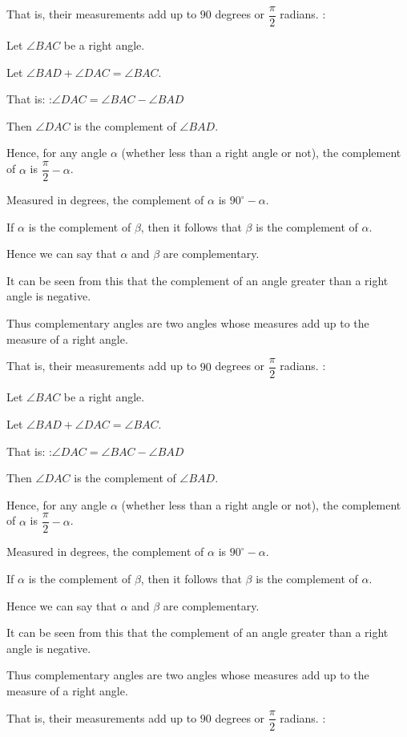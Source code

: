 That is, their measurements add up to $90$ degrees or $\dfrac \pi 2$ radians.
:

Let $\angle BAC$ be a right angle.

Let $\angle BAD + \angle DAC = \angle BAC$.

That is:
:$\angle DAC = \angle BAC - \angle BAD$


Then $\angle DAC$ is the complement of $\angle BAD$.


Hence, for any angle $\alpha$ (whether less than a right angle or not), the complement of $\alpha$ is $\dfrac \pi 2 - \alpha$.

Measured in degrees, the complement of $\alpha$ is $90^\circ - \alpha$.


If $\alpha$ is the complement of $\beta$, then it follows that $\beta$ is the complement of $\alpha$.

Hence we can say that $\alpha$ and $\beta$ are complementary.


It can be seen from this that the complement of an angle greater than a right angle is negative.


Thus complementary angles are two angles whose measures add up to the measure of a right angle.

That is, their measurements add up to $90$ degrees or $\dfrac \pi 2$ radians.
:

Let $\angle BAC$ be a right angle.

Let $\angle BAD + \angle DAC = \angle BAC$.

That is:
:$\angle DAC = \angle BAC - \angle BAD$


Then $\angle DAC$ is the complement of $\angle BAD$.


Hence, for any angle $\alpha$ (whether less than a right angle or not), the complement of $\alpha$ is $\dfrac \pi 2 - \alpha$.

Measured in degrees, the complement of $\alpha$ is $90^\circ - \alpha$.


If $\alpha$ is the complement of $\beta$, then it follows that $\beta$ is the complement of $\alpha$.

Hence we can say that $\alpha$ and $\beta$ are complementary.


It can be seen from this that the complement of an angle greater than a right angle is negative.


Thus complementary angles are two angles whose measures add up to the measure of a right angle.

That is, their measurements add up to $90$ degrees or $\dfrac \pi 2$ radians.
:

